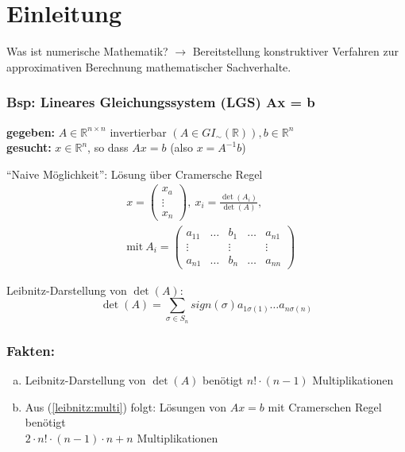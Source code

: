 \section{Einleitung}
Was ist numerische Mathematik?
$\rightarrow$ Bereitstellung konstruktiver Verfahren zur
approximativen Berechnung mathematischer Sachverhalte.

\subsubsection*{Bsp: Lineares Gleichungssystem (LGS) Ax = b}
\textbf{gegeben:} $A \in \mathbb{R}^{n \times n}$ invertierbar
$(A \in GI_{\sim} (\mathbb{R})), b \in \mathbb{R}^n$ \\
\textbf{gesucht:} $x \in \mathbb{R}^n$, so dass $Ax = b$ (also $x = A^{-1} b$)

"`Naive Möglichkeit"': Lösung über Cramersche Regel
\begin{align}
\label{cramer1}
& x = \begin{pmatrix} x_a \\ \vdots \\ x_n \end{pmatrix},
~ x_i = \frac{\det(A_i)}{\det (A)},\\
\label{cramer2}
& \text{mit}~
A_i = \begin{pmatrix} a_{11} & \dots & b_1 & \dots & a_{n1}
\\ \vdots & & \vdots & & \vdots \\ a_{n1} & \dots & b_n &
\dots & a_{nn} \end{pmatrix}
\end{align}

Leibnitz-Darstellung von $\det(A)$:
\begin{displaymath}
\det(A) = \sum_{\sigma \in S_n} sign (\sigma) a_{1\sigma(1)}
\dots a_{n\sigma(n)}
\end{displaymath}

\subsubsection*{Fakten:}
\begin{enumerate}[(a)]
\item\label{leibnitz:multi}
Leibnitz-Darstellung von $\det(A)$ benötigt $n! \cdot (n-1)$ Multiplikationen
\item
Aus (\ref{leibnitz:multi}) folgt: Lösungen von $Ax=b$ mit Cramerschen Regel benötigt \\
$2 \cdot  n!\cdot(n-1) \cdot n + n$ Multiplikationen
\end{enumerate}

